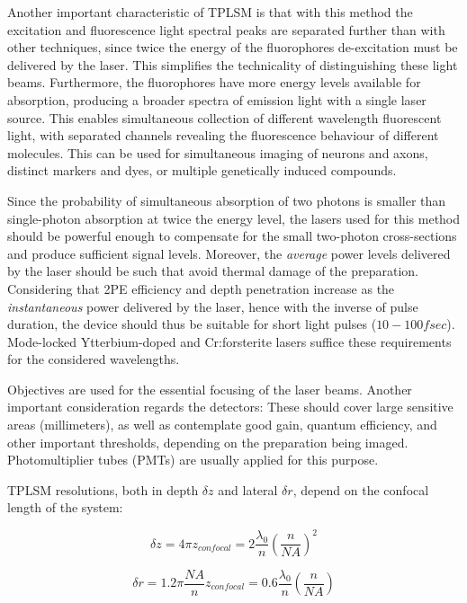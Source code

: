 Another important characteristic of TPLSM is that with this method the excitation and fluorescence light spectral peaks are separated further than with other techniques, since twice the energy of the fluorophores de-excitation must be delivered by the laser. This simplifies the technicality of distinguishing these light beams. Furthermore, the fluorophores have more energy levels available for absorption, producing a broader spectra of emission light with a single laser source. This enables simultaneous collection of different wavelength fluorescent light, with separated channels revealing the fluorescence behaviour of different molecules. This can be used for simultaneous imaging of neurons and axons, distinct markers and dyes, or multiple genetically induced compounds.

Since the probability of simultaneous absorption of two photons is smaller than single-photon absorption at twice the energy level, the lasers used for this method should be powerful enough to compensate for the small two-photon cross-sections and produce sufficient signal levels. Moreover, the \textit{average} power levels delivered by the laser should be such that avoid thermal damage of the preparation. Considering that 2PE efficiency and depth penetration increase as the \textit{instantaneous} power delivered by the laser, hence with the inverse of pulse duration, the device should thus be suitable for short light pulses ($10-100 fsec$). Mode-locked Ytterbium-doped and Cr:forsterite lasers suffice these requirements for the considered wavelengths.

Objectives are used for the essential focusing of the laser beams. Another important consideration regards the detectors: These should cover large sensitive areas (millimeters), as well as contemplate good gain, quantum efficiency, and other important thresholds, depending on the preparation being imaged. Photomultiplier tubes (PMTs) are usually applied for this purpose.

TPLSM resolutions, both in depth $\delta z$ and lateral $\delta r$, depend on the confocal length of the system:

\begin{equation}
\delta z = 4 \pi z_{confocal} = 2 \dfrac{\lambda _0}{n}\left( \dfrac{n}{NA} \right) ^2
\end{equation}

\begin{equation}
\delta r = 1.2 \pi \dfrac{NA}{n} z_{confocal} = 0.6 \dfrac{\lambda _0}{n}\left( \dfrac{n}{NA} \right)
\end{equation}

